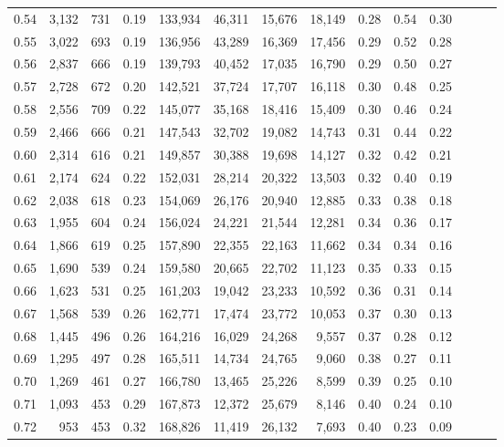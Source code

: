 \begin{tabular}{rrrrrrrrrrrrrr}
0.54 &  3,132 &  731 &  0.19 &  133,934 &   46,311 &  15,676 &  18,149 &  0.28 &  0.54 &      0.30 \\
0.55 &  3,022 &  693 &  0.19 &  136,956 &   43,289 &  16,369 &  17,456 &  0.29 &  0.52 &      0.28 \\
0.56 &  2,837 &  666 &  0.19 &  139,793 &   40,452 &  17,035 &  16,790 &  0.29 &  0.50 &      0.27 \\
0.57 &  2,728 &  672 &  0.20 &  142,521 &   37,724 &  17,707 &  16,118 &  0.30 &  0.48 &      0.25 \\
0.58 &  2,556 &  709 &  0.22 &  145,077 &   35,168 &  18,416 &  15,409 &  0.30 &  0.46 &      0.24 \\
0.59 &  2,466 &  666 &  0.21 &  147,543 &   32,702 &  19,082 &  14,743 &  0.31 &  0.44 &      0.22 \\
0.60 &  2,314 &  616 &  0.21 &  149,857 &   30,388 &  19,698 &  14,127 &  0.32 &  0.42 &      0.21 \\
0.61 &  2,174 &  624 &  0.22 &  152,031 &   28,214 &  20,322 &  13,503 &  0.32 &  0.40 &      0.19 \\
0.62 &  2,038 &  618 &  0.23 &  154,069 &   26,176 &  20,940 &  12,885 &  0.33 &  0.38 &      0.18 \\
0.63 &  1,955 &  604 &  0.24 &  156,024 &   24,221 &  21,544 &  12,281 &  0.34 &  0.36 &      0.17 \\
0.64 &  1,866 &  619 &  0.25 &  157,890 &   22,355 &  22,163 &  11,662 &  0.34 &  0.34 &      0.16 \\
0.65 &  1,690 &  539 &  0.24 &  159,580 &   20,665 &  22,702 &  11,123 &  0.35 &  0.33 &      0.15 \\
0.66 &  1,623 &  531 &  0.25 &  161,203 &   19,042 &  23,233 &  10,592 &  0.36 &  0.31 &      0.14 \\
0.67 &  1,568 &  539 &  0.26 &  162,771 &   17,474 &  23,772 &  10,053 &  0.37 &  0.30 &      0.13 \\
0.68 &  1,445 &  496 &  0.26 &  164,216 &   16,029 &  24,268 &   9,557 &  0.37 &  0.28 &      0.12 \\
0.69 &  1,295 &  497 &  0.28 &  165,511 &   14,734 &  24,765 &   9,060 &  0.38 &  0.27 &      0.11 \\
0.70 &  1,269 &  461 &  0.27 &  166,780 &   13,465 &  25,226 &   8,599 &  0.39 &  0.25 &      0.10 \\
0.71 &  1,093 &  453 &  0.29 &  167,873 &   12,372 &  25,679 &   8,146 &  0.40 &  0.24 &      0.10 \\
0.72 &    953 &  453 &  0.32 &  168,826 &   11,419 &  26,132 &   7,693 &  0.40 &  0.23 &      0.09 \\

\end{tabular}
